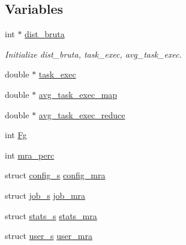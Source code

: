 \subsection*{\-Variables}
\begin{DoxyCompactItemize}
\item 
int $\ast$ \hyperlink{common-mra_8h_a25cc609dae2875ebd3e01dec54626409}{dist\-\_\-bruta}
\begin{DoxyCompactList}\small\item\em \-Initialize dist\-\_\-bruta, task\-\_\-exec, avg\-\_\-task\-\_\-exec. \end{DoxyCompactList}\item 
double $\ast$ \hyperlink{common-mra_8h_a3643aab6c35479d8e7c2f7e46bdb04b8}{task\-\_\-exec}
\item 
double $\ast$ \hyperlink{common-mra_8h_afc43959c8dc45a0582a605a20e83aa0d}{avg\-\_\-task\-\_\-exec\-\_\-map}
\item 
double $\ast$ \hyperlink{common-mra_8h_ad5b90869efe31de6176f099e9cf99de5}{avg\-\_\-task\-\_\-exec\-\_\-reduce}
\item 
int \hyperlink{common-mra_8h_a40c5dda5ba96917071a5d075c25444b2}{\-Fg}
\item 
int \hyperlink{common-mra_8h_aaa0bc264a86ff2516e39fdba05b72b66}{mra\-\_\-perc}
\item 
struct \hyperlink{structconfig__s}{config\-\_\-s} \hyperlink{common-mra_8h_a1860c3de3eef8309ccc6b068eb3a08f6}{config\-\_\-mra}
\item 
struct \hyperlink{structjob__s}{job\-\_\-s} \hyperlink{common-mra_8h_a110d69f20330d00e3fa77e764feb5d54}{job\-\_\-mra}
\item 
struct \hyperlink{structstats__s}{stats\-\_\-s} \hyperlink{common-mra_8h_aa526e398bda7952ec6bcc5c33d39abac}{stats\-\_\-mra}
\item 
struct \hyperlink{structuser__s}{user\-\_\-s} \hyperlink{common-mra_8h_ad7eb2fd97a2f868b28c25405de9a4e72}{user\-\_\-mra}
\end{DoxyCompactItemize}


